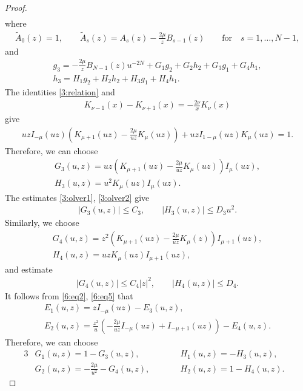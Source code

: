 \documentclass[pdftex]{sigma}
\numberwithin{equation}{section}
\begin{document}
\begin{proof}
\begin{gather}
\end{gather}
where
\begin{gather*} \tilde A_0(z)=1,\qquad \tilde A_s(z)=A_s(z)-\frac{2\mu}{z}B_{s-1}(z) \qquad \text{for} \quad s=1,\dots,N-1,
\end{gather*}
and
\begin{gather*}
g_3 = -\frac{2\mu}{z}B_{N-1}(z)u^{-2N}+ G_1 g_2+G_2h_2+G_3 g_1+G_4 h_1,\\
h_3 = H_1 g_2+H_2h_2+H_3 g_1+H_4 h_1.
\end{gather*}
The identities \eqref{3:relation} and \cite[(10.29.1)]{NIST}
\begin{gather}\label{6:eq7}
K_{\nu-1}(x)-K_{\nu+1}(x)=-\frac{2\nu}{x}K_\nu(x)
\end{gather}
give
\begin{gather*}%
uzI_{-\mu}(uz)\left(K_{\mu+1}(uz)-\frac{2\mu}{uz}K_\mu(uz)\right)+uzI_{1-\mu}(uz)K_\mu(uz)=1 .
\end{gather*}
Therefore, we can choose
\begin{gather*}
G_3(u,z) = uz\left(K_{\mu+1}(uz)-\frac{2\mu}{uz}K_\mu(uz)\right)I_\mu(uz),\\
H_3(u,z) = u^2K_\mu(uz)I_\mu(uz) .
\end{gather*}
The estimates \eqref{3:olver1}, \eqref{3:olver2} give
\begin{gather}\label{6:est1}
|G_3(u,z)|\le C_3,\qquad |H_3(u,z)|\le D_3 u^2.
\end{gather}
Similarly, we choose
\begin{gather*}
G_4(u,z) = z^2\left(K_{\mu+1}(uz)-\frac{2\mu}{uz}K_\mu(z)\right)I_{\mu+1}(uz),\\
H_4(u,z) = uzK_\mu(uz)I_{\mu+1}(uz),
\end{gather*}
and estimate
\begin{gather}\label{6:est2}
|G_4(u,z)|\le C_4|z|^2,\qquad|H_4(u,z)|\le D_4.
\end{gather}
It follows from \eqref{6:eq2}, \eqref{6:eq5} that
\begin{gather*}
E_1(u,z) = zI_{-\mu}(uz)-E_3(u,z),\\
E_2(u,z) = \frac{z^2}{u}\left(-\frac{2\mu}{uz}I_{-\mu}(uz)+I_{-\mu+1}(uz)\right)-E_4(u,z) .
\end{gather*}
Therefore, we can choose
\begin{alignat*}{3}
& G_1(u,z) = 1-G_3(u,z) ,\qquad && H_1(u,z) = -H_3(u,z),& \\
& G_2(u,z) = -\frac{2\mu}{u^2}-G_4(u,z),\qquad && H_2(u,z) = 1-H_4(u,z).&
\end{alignat*}

\end{proof}
\end{document}
